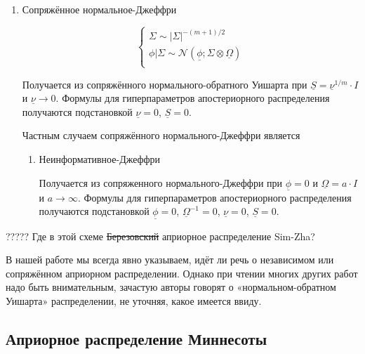 \documentclass[11pt]{article} %
\newcommand{\cN}{\mathcal{N}}
\newcommand{\prior}{\underline}
\begin{document}
\begin{enumerate}
\begin{enumerate}
\item Сопряжённое нормальное-Джеффри


\begin{equation}
\begin{cases}
\Sigma \sim |\Sigma|^{-(m+1)/2} \\
\phi | \Sigma \sim \cN(\prior\phi; \Sigma \otimes \prior\Omega ) \\
\end{cases}
\end{equation}




Получается из сопряжённого нормального-обратного Уишарта при $\prior S
= \prior \nu^{1/m}\cdot I$ и  $\prior \nu \to 0$.  Формулы для
гиперпараметров апостериорного распределения получаются подстановкой
$\prior\nu=0$, $\prior S=0$.


Частным случаем сопряжённого нормального-Джеффри является

\begin{enumerate}

\item Неинформативное-Джеффри


Получается из сопряженного нормального-Джеффри при $\prior\phi=0$ и
$\prior\Omega= a\cdot I$ и $a\to \infty$. Формулы для гиперпараметров
апостериорного распределения получаются подстановкой $\prior\phi=0$,
$\prior\Omega^{-1}=0$, $\prior\nu=0$, $\prior S=0$.

\end{enumerate}



\end{enumerate}


\end{enumerate}



????? Где в этой схеме \st{Березовский} априорное распределение Sim-Zha?



В нашей работе мы всегда явно указываем, идёт ли речь о независимом
или сопряжённом априорном распределении. Однако при чтении многих
других работ надо быть внимательным, зачастую авторы говорят о
«нормальном-обратном Уишарта» распределении, не уточняя, какое имеется
ввиду.

\subsection{Априорное распределение Миннесоты}
\end{document}
